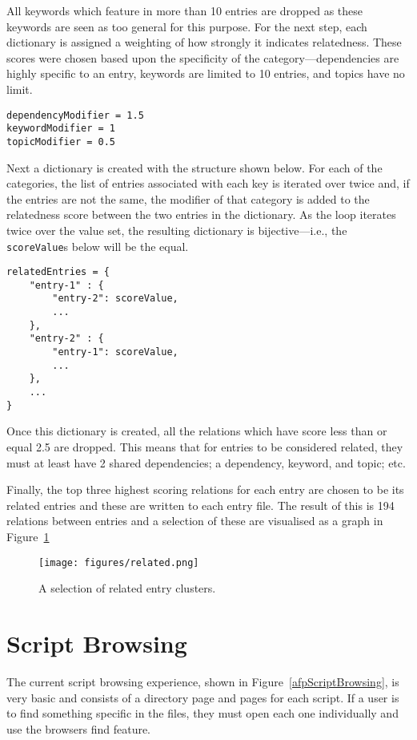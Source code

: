\documentclass[bsc,frontabs,oneside,singlespacing,parskip,deptreport,logo]{infthesis}
\begin{document}
All keywords which feature in more than 10 entries are dropped as these keywords are seen as too general for this purpose. For the next step, each dictionary is assigned a weighting of how strongly it indicates relatedness. These scores were chosen based upon the specificity of the category---dependencies are highly specific to an entry, keywords are limited to 10 entries, and topics have no limit. 

{\footnotesize
\begin{verbatim}
dependencyModifier = 1.5
keywordModifier = 1
topicModifier = 0.5
\end{verbatim}
}

Next a dictionary is created with the structure shown below. For each of the categories, the list of entries associated with each key is iterated over twice and, if the entries are not the same, the modifier of that category is added to the relatedness score between the two entries in the dictionary. As the loop iterates twice over the value set, the resulting dictionary is bijective---i.e., the \texttt{scoreValue}s below will be the equal.
\cbend
{\footnotesize
\begin{verbatim}
relatedEntries = {
    "entry-1" : {
        "entry-2": scoreValue,
        ...
    },
    "entry-2" : {
        "entry-1": scoreValue,
        ...
    },
    ...
}
\end{verbatim}
}
\cbstart
Once this dictionary is created, all the relations which have score less than or equal 2.5 are dropped. This means that for entries to be considered related, they must at least have 2 shared dependencies; a dependency, keyword, and topic; etc.

Finally, the top three highest scoring relations for each entry are chosen to be its related entries and these are written to each entry file. The result of this is 194 relations between entries and a selection of these are visualised as a graph in Figure~\ref{fig:related}

\begin{figure}[h]
    \centering
    \texttt{[image: figures/related.png]}
    \caption{A selection of related entry clusters.}
    \label{fig:related}
\end{figure}

\cbend
\section{Script Browsing} \label{script-browsing}

The current script browsing experience, shown in Figure~\ref{afpScriptBrowsing}, is very basic and consists of a directory page and pages for each script. If a user is to find something specific in the files, they must open each one individually and use the browsers find feature.
\end{document}

